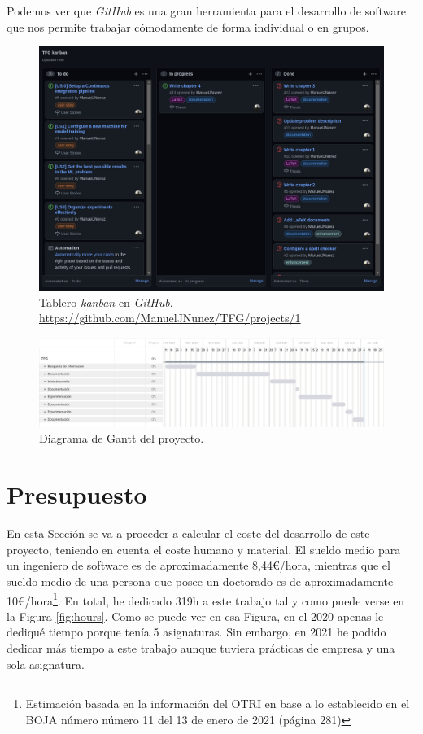 Podemos ver que \textit{GitHub} es una gran herramienta para el desarrollo de software que nos permite trabajar cómodamente de forma individual o en grupos.

\begin{figure}[H]
	\includegraphics[scale=0.3]{imagenes/04_Planificacion/kanban.png}
	\centering
	\caption{Tablero \textit{kanban} en \textit{GitHub}. \url{https://github.com/ManuelJNunez/TFG/projects/1}}
	\label{fig:kanban}
\end{figure}

\begin{figure}[H]
  \centering
  \includegraphics[width=1.\linewidth]{imagenes/04_Planificacion/gantt.png} 
  \caption{Diagrama de Gantt del proyecto.}
  \label{fig:gantt}
\end{figure}

\section{Presupuesto}

En esta Sección se va a proceder a calcular el coste del desarrollo de este proyecto, teniendo en cuenta el coste humano y material. El sueldo medio para un ingeniero de software es de aproximadamente 8,44\euro/hora, mientras que el sueldo medio de una persona que posee un doctorado es de aproximadamente 10\euro/hora\footnote{Estimación basada en la información del OTRI \cite{otri} en base a lo establecido en el BOJA número número 11 del 13 de enero de 2021 (página 281)}. En total, he dedicado 319h a este trabajo tal y como puede verse en la Figura \ref{fig:hours}. Como se puede ver en esa Figura, en el 2020 apenas le dediqué tiempo porque tenía 5 asignaturas. Sin embargo, en 2021 he podido dedicar más tiempo a este trabajo aunque tuviera prácticas de empresa y una sola asignatura.\\

